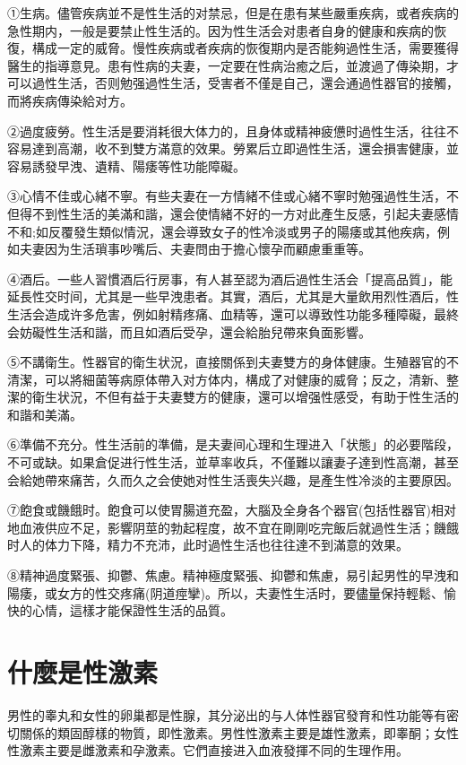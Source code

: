 \documentclass[12pt,UTF8]{ctexbook}
\begin{document}
①生病。儘管疾病並不是性生活的对禁忌，但是在患有某些嚴重疾病，或者疾病的急性期内，一般是要禁止性生活的。因为性生活会对患者自身的健康和疾病的恢復，構成一定的威脅。慢性疾病或者疾病的恢復期内是否能夠過性生活，需要獲得醫生的指導意見。患有性病的夫妻，一定要在性病治癒之后，並渡過了傳染期，才可以過性生活，否则勉强過性生活，受害者不僅是自己，還会通過性器官的接觸，而將疾病傳染給对方。

②過度疲勞。性生活是要消耗很大体力的，且身体或精神疲憊时過性生活，往往不容易達到高潮，收不到雙方滿意的效果。勞累后立即過性生活，還会損害健康，並容易誘發早洩、遺精、陽痿等性功能障礙。

③心情不佳或心緒不寧。有些夫妻在一方情緒不佳或心緒不寧时勉强過性生活，不但得不到性生活的美滿和諧，還会使情緒不好的一方对此產生反感，引起夫妻感情不和;如反覆發生類似情況，還会導致女子的性冷淡或男子的陽痿或其他疾病，例如夫妻因为生活瑣事吵嘴后、夫妻問由于擔心懷孕而顧慮重重等。

④酒后。一些人習慣酒后行房事，有人甚至認为酒后過性生活会「提高品質」，能延長性交时间，尤其是一些早洩患者。其實，酒后，尤其是大量飲用烈性酒后，性生活会造成许多危害，例如射精疼痛、血精等，還可以導致性功能多種障礙，最終会妨礙性生活和諧，而且如酒后受孕，還会給胎兒帶來負面影響。

⑤不講衛生。性器官的衛生状況，直接關係到夫妻雙方的身体健康。生殖器官的不清潔，可以將細菌等病原体帶入对方体内，構成了对健康的威脅；反之，清新、整潔的衛生状況，不但有益于夫妻雙方的健康，還可以增强性感受，有助于性生活的和諧和美滿。

⑥準備不充分。性生活前的準備，是夫妻间心理和生理进入「状態」的必要階段，不可或缺。如果倉促进行性生活，並草率收兵，不僅難以讓妻子達到性高潮，甚至会給她帶來痛苦，久而久之会使她对性生活喪失兴趣，是產生性冷淡的主要原因。

⑦飽食或饑餓时。飽食可以使胃腸道充盈，大腦及全身各个器官(包括性器官)相对地血液供应不足，影響阴莖的勃起程度，故不宜在剛剛吃完飯后就過性生活；饑餓时人的体力下降，精力不充沛，此时過性生活也往往達不到滿意的效果。

⑧精神過度緊張、抑鬱、焦慮。精神極度緊張、抑鬱和焦慮，易引起男性的早洩和陽痿，或女方的性交疼痛(阴道痙攣)。所以，夫妻性生活时，要儘量保持輕鬆、愉快的心情，這樣才能保證性生活的品質。

\section{什麼是性激素}

男性的睾丸和女性的卵巢都是性腺，其分泌出的与人体性器官發育和性功能等有密切關係的類固醇樣的物質，即性激素。男性性激素主要是雄性激素，即睾酮；女性性激素主要是雌激素和孕激素。它們直接进入血液發揮不同的生理作用。
\end{document}

